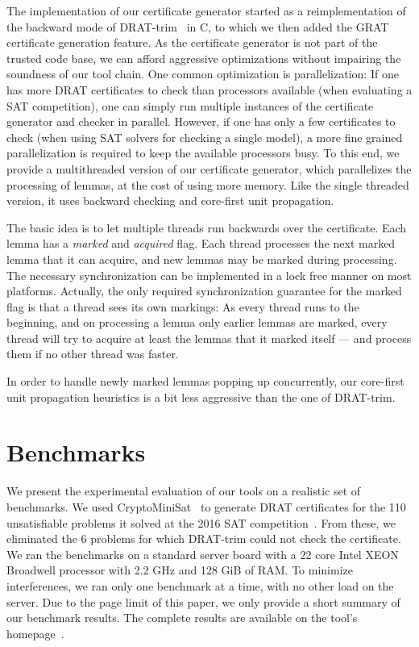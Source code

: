 \documentclass{llncs}
\newcommand\CC{C\nolinebreak[4]\hspace{-.05em}\raisebox{.4ex}{\relsize{-3}{\textbf{++}}}}
\begin{document}
The implementation of our certificate generator started as a reimplementation of the backward mode of DRAT-trim~\cite{WHH13,drat-trim-webpage} in \CC, to 
which we then added the GRAT certificate generation feature. 
As the certificate generator is not part of the trusted code base, we can afford aggressive optimizations without impairing the soundness of our tool chain.
One common optimization is parallelization: If one has more DRAT certificates to check than processors 
available (\eg when evaluating a SAT competition), one can simply run multiple instances of the certificate generator and checker in parallel.
However, if one has only a few certificates to check (\eg when using SAT solvers for checking a single model), a more fine grained parallelization 
is required to keep the available processors busy. To this end, we provide a multithreaded version of our certificate generator, 
which parallelizes the processing of lemmas, at the cost of using more memory. Like the single threaded version, it uses backward checking and 
core-first unit propagation.

The basic idea is to let multiple threads run backwards over the certificate. Each lemma has a \emph{marked} and \emph{acquired} flag. 
Each thread processes the next marked lemma that it can acquire, and new lemmas may be marked during processing.
The necessary synchronization can be implemented in a lock free manner on most platforms. 
Actually, the only required synchronization guarantee for the marked flag is that a thread sees its own markings:
As every thread runs to the beginning, 
and on processing a lemma only earlier lemmas are marked, every thread will try to acquire at least the lemmas that it marked itself --- and 
process them if no other thread was faster. 

In order to handle newly marked lemmas popping up concurrently, our 
core-first unit propagation heuristics is a bit less aggressive than the one of DRAT-trim.

\section{Benchmarks}\label{sec:benchmarks}
We present the experimental evaluation of our tools on a realistic set of benchmarks.
We used CryptoMiniSat~\cite{SNC09,SATCOMP16} to generate DRAT certificates for the 110 unsatisfiable problems it solved at the 2016 SAT competition~\cite{satcomp-2016}.
From these, we eliminated the 6 problems for which DRAT-trim could not check the certificate.
We ran the benchmarks on a standard server board with a 22 core Intel XEON Broadwell processor with 2.2 GHz and 128 GiB of RAM.
To minimize interferences, we ran only one benchmark at a time, with no other load on the server. 
Due to the page limit of this paper, we only provide a short summary of our benchmark results. The complete results are available on the tool's homepage~\cite{GRAT-homepage}.
\end{document}

